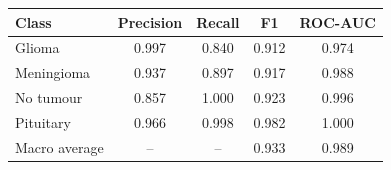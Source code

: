\begin{tabular}{lcccc}
\toprule
Class & Precision & Recall & F1 & ROC-AUC \\
\midrule
Glioma & 0.997 & 0.840 & 0.912 & 0.974 \\
Meningioma & 0.937 & 0.897 & 0.917 & 0.988 \\
No tumour & 0.857 & 1.000 & 0.923 & 0.996 \\
Pituitary & 0.966 & 0.998 & 0.982 & 1.000 \\
\midrule
Macro average & -- & -- & 0.933 & 0.989 \\
\bottomrule
\end{tabular}